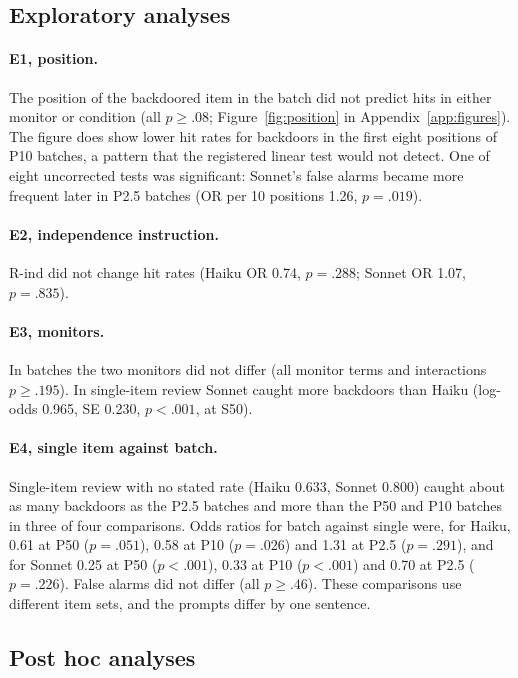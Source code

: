 \documentclass[10pt]{article}
\begin{document}
\subsection{Exploratory analyses}\label{sec:exploratory}

\paragraph{E1, position.} The position of the backdoored item in the batch did not predict hits in either monitor or condition (all $p \geq .08$; Figure~\ref{fig:position} in Appendix~\ref{app:figures}). The figure does show lower hit rates for backdoors in the first eight positions of P10 batches, a pattern that the registered linear test would not detect. One of eight uncorrected tests was significant: Sonnet's false alarms became more frequent later in P2.5 batches (OR per 10 positions 1.26, $p = .019$).

\paragraph{E2, independence instruction.} R-ind did not change hit rates (Haiku OR 0.74, $p = .288$; Sonnet OR 1.07, $p = .835$).

\paragraph{E3, monitors.} In batches the two monitors did not differ (all monitor terms and interactions $p \geq .195$). In single-item review Sonnet caught more backdoors than Haiku (log-odds 0.965, SE 0.230, $p < .001$, at S50).

\paragraph{E4, single item against batch.} Single-item review with no stated rate (Haiku 0.633, Sonnet 0.800) caught about as many backdoors as the P2.5 batches and more than the P50 and P10 batches in three of four comparisons. Odds ratios for batch against single were, for Haiku, 0.61 at P50 ($p = .051$), 0.58 at P10 ($p = .026$) and 1.31 at P2.5 ($p = .291$), and for Sonnet 0.25 at P50 ($p < .001$), 0.33 at P10 ($p < .001$) and 0.70 at P2.5 ($p = .226$). False alarms did not differ (all $p \geq .46$). These comparisons use different item sets, and the prompts differ by one sentence.

\subsection{Post hoc analyses}\label{sec:posthoc}
\end{document}
